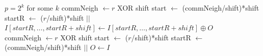 \begin{algorithm}
	\caption{– Reduce\_Scatter and Allgather\\
		\textit{r}: rank Id\\
		\textit{p}: number of processes\\
		: Input array\\
		\textit{O}: Output array} \label{algo:redScatterAndAllreduce}
\begin{algorithmic}[1]
	\Ensure $p=2^k$ for some $k$
		\State commNeigh $\gets r $ XOR shift 
		\State start $\gets $ (commNeigh/shift)*shift
		\State startR $\gets $ ($r$/shift)*shift
		\State {} $||$ 
		\\ 
		\State $I[startR, \dots, startR + shift] \gets I[startR, \dots, startR + shift]\oplus O$
		\\ 
	\EndFor
		\State commNeigh $\gets r $ XOR shift 
		\State start $\gets $ ($r$/shift)*shift
		\State startR $\gets $ (commNeigh/shift)*shift
		\State {} $||$
		\State {}
	\EndFor
	\State $O \gets I$
	\EndProcedure
\end{algorithmic}
\end{algorithm}

